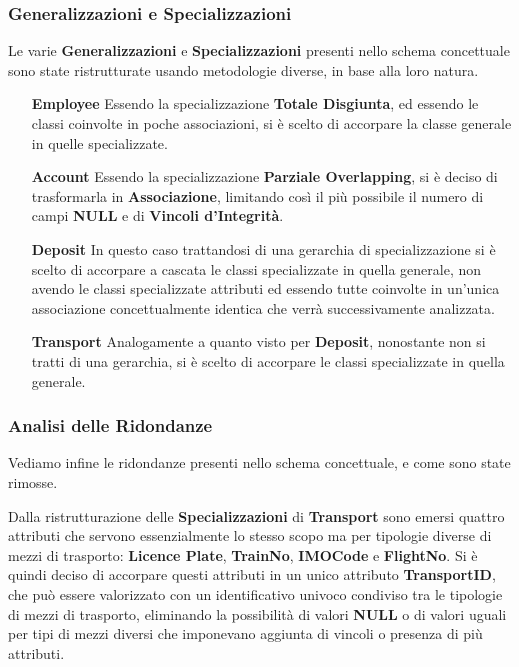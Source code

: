 \subsubsection{Generalizzazioni e Specializzazioni}

Le varie \textbf{Generalizzazioni} e \textbf{Specializzazioni} presenti nello schema concettuale sono state ristrutturate usando metodologie diverse, in base alla loro natura.

\begin{itemize}
  \item[\textbf{Employee}] Essendo la specializzazione \textbf{Totale Disgiunta}, ed essendo le classi coinvolte in poche associazioni, si è scelto di accorpare la classe generale in quelle specializzate.
  \item[\textbf{Account}] Essendo la specializzazione \textbf{Parziale Overlapping}, si è deciso di trasformarla in \textbf{Associazione}, limitando così il più possibile il numero di campi \textbf{NULL} e di \textbf{Vincoli d'Integrità}.
  \item[\textbf{Deposit}] In questo caso trattandosi di una gerarchia di specializzazione si è scelto di accorpare a cascata le classi specializzate in quella generale, non avendo le classi specializzate attributi ed essendo tutte coinvolte in un'unica associazione concettualmente identica che verrà successivamente analizzata.
  \item[\textbf{Transport}] Analogamente a quanto visto per \textbf{Deposit}, nonostante non si tratti di una gerarchia, si è scelto di accorpare le classi specializzate in quella generale. 
\end{itemize}

\subsubsection{Analisi delle Ridondanze}

Vediamo infine le ridondanze presenti nello schema concettuale, e come sono state rimosse.

Dalla ristrutturazione delle \textbf{Specializzazioni} di \textbf{Transport} sono emersi quattro attributi che servono essenzialmente lo stesso scopo ma per tipologie diverse di mezzi di trasporto: \textbf{Licence Plate}, \textbf{TrainNo}, \textbf{IMOCode} e \textbf{FlightNo}. Si è quindi deciso di accorpare questi attributi in un unico attributo \textbf{TransportID}, che può essere valorizzato con un identificativo univoco condiviso tra le tipologie di mezzi di trasporto, eliminando la possibilità di valori \textbf{NULL} o di valori uguali per tipi di mezzi diversi che imponevano aggiunta di vincoli o presenza di più attributi.

